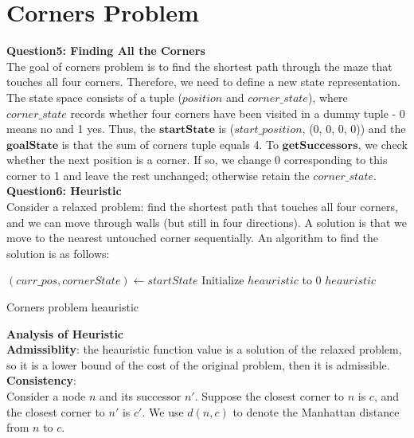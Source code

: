 \documentclass[UTF8]{ctexart}
\begin{document}
\section{Corners Problem}
\textbf{Question5: Finding All the Corners}\\
The goal of corners problem is to find the shortest path through the maze that touches all four corners. Therefore, we need to define a new state representation.
The state space consists of a tuple ($position$ and $corner\_state$), where $corner\_state$ records whether four corners have been visited in a dummy tuple - 0 means no and 1 yes.
Thus, the $\textbf{startState}$ is ($start\_position$, (0, 0, 0, 0)) and the $\textbf{goalState}$ is that the sum of corners tuple equals 4. To $\textbf{getSuccessors}$, we  check whether
the next position is a corner. If so, we change 0 corresponding to this corner to 1 and leave the rest unchanged; otherwise retain the $corner\_state$.\\
\textbf{Question6: Heuristic}\\
Consider a relaxed problem: find the shortest path that touches all four corners, and we can move through walls (but still in four directions). A solution is that we move to the nearest untouched corner sequentially.
An algorithm to find the solution is as follows:\\
\begin{algorithm}[H]
  \DontPrintSemicolon
    \SetAlgoLined
    $(curr\_pos , cornerState) \gets startState$\;
    Initialize $heauristic$ to 0\;
    \Return $heauristic$ \;
    \caption{Corners problem heauristic}
  \end{algorithm}
\textbf{Analysis of Heuristic}\\
\textbf{Admissiblity}: the heauristic function value is a solution of the relaxed problem, so it is a lower bound of the cost of the original problem, then it is admissible.\\
\textbf{Consistency}:\\ 
Consider a node $n$ and its successor $n'$. Suppose the closest corner to $n$ is $c$, and the closest corner to $n'$ is $c'$. We use $d(n, c)$ to denote the Manhattan distance from $n$ to $c$.\\
\end{document}
